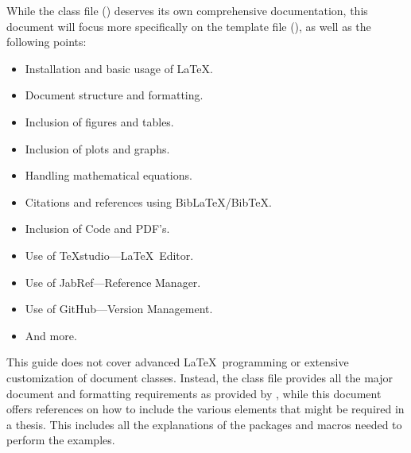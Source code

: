 		While the class file () deserves its own comprehensive documentation, this document will focus more specifically on the template file (), as well as the following points:
		\begin{itemize}
			\item Installation and basic usage of \LaTeX.
			\item Document structure and formatting.
			\item Inclusion of figures and tables.
			\item Inclusion of plots and graphs.
			\item Handling mathematical equations.
			\item Citations and references using BibLaTeX/BibTeX.
			\item Inclusion of Code and PDF's.
			\item Use of TeXstudio---\LaTeX\ Editor.
			\item Use of JabRef---Reference Manager.
			\item Use of GitHub---Version Management.
			\item And more.
		\end{itemize}

		This guide does not cover advanced \LaTeX\ programming or extensive customization of document classes.
		Instead, the class file  provides all the major document and formatting requirements as provided by \Fac, while this document offers references on how to include the various elements that might be required in a thesis.
		This includes all the explanations of the packages and macros needed to perform the examples.

